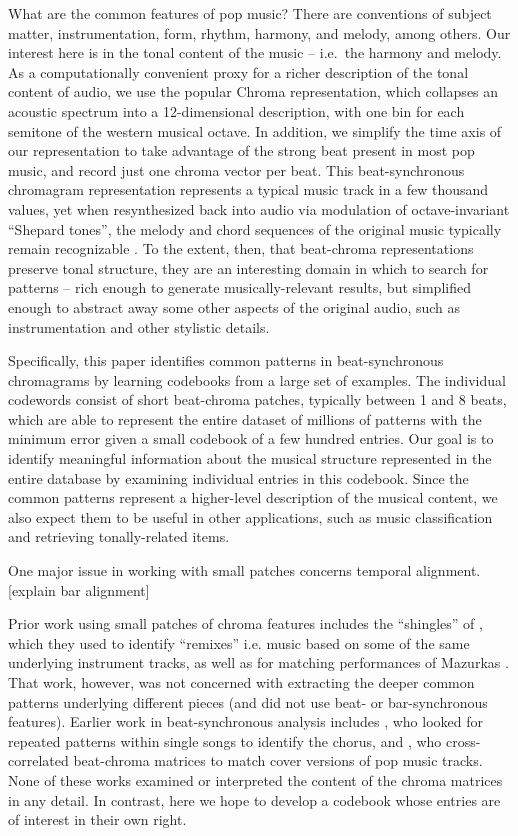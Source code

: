 \documentclass{article}
\newcommand{\ie}{i.e.~}
\begin{document}
What are the common features of pop music?  There are conventions
of subject matter, instrumentation, form, rhythm, harmony, and melody, among
others.  Our interest here is in the tonal content of the music -- \ie the
harmony and melody.  As a computationally convenient proxy for a richer
description of the tonal content of audio, we use the popular Chroma
representation, which collapses an acoustic spectrum into a 12-dimensional
description, with one bin for each semitone of the western musical octave.
In addition, we simplify the time axis of our representation to take advantage
of the strong beat present in most pop music, and record just one
chroma vector per beat.  This beat-synchronous chromagram
representation represents a typical music track
in a few thousand values, yet when resynthesized back into audio via
modulation of octave-invariant ``Shepard tones'', the melody and
chord sequences of the original music typically remain recognizable
\cite{Ellis2007a}.  To the extent, then, that beat-chroma
representations preserve tonal structure, they
are an interesting domain in which to search for patterns -- rich enough
to generate musically-relevant results, but simplified enough to
abstract away some other aspects of the original audio, such as
instrumentation and other stylistic details.

Specifically, this paper identifies common patterns in beat-synchronous
chromagrams by learning codebooks from a large set of examples.
The individual codewords consist of short beat-chroma patches, typically
between 1 and 8 beats, which are able to represent the entire dataset
of millions of patterns with the minimum error given a small codebook of
a few hundred entries.  Our goal is to identify meaningful information
about the musical structure represented in the entire database by
examining individual entries in this codebook.  Since the common
patterns represent a higher-level description of the musical content,
we also expect them to be useful in other applications, such as
music classification and retrieving tonally-related items.

One major issue in working with small patches concerns temporal
alignment.  [explain bar alignment]

Prior work using small patches of chroma features includes
the ``shingles'' of \cite{Casey2007}, which they used to
identify ``remixes'' i.e. music based on some of the same
underlying instrument tracks, as well as for matching
performances of Mazurkas \cite{Casey2008}.  That work,
however, was not concerned with extracting the deeper
common patterns underlying different pieces (and did not
use beat- or bar-synchronous features).  Earlier work in
beat-synchronous analysis includes \cite{Bartsch2001},
who looked for repeated patterns within single songs to
identify the chorus, and \cite{Ellis2007a}, who
cross-correlated beat-chroma matrices to match cover
versions of pop music tracks.  None of these works
examined or interpreted the content of the chroma
matrices in any detail.  In contrast, here we hope to
develop a codebook whose entries are of interest
in their own right.
\end{document}
